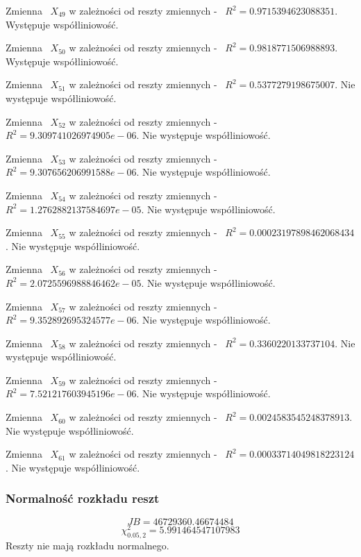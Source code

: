 \documentclass{article}
\begin{document}
Zmienna ~$X_{49}$ w zależności od reszty zmiennych - ~$R^2 = 0.9715394623088351$.
Występuje współliniowość.

Zmienna ~$X_{50}$ w zależności od reszty zmiennych - ~$R^2 = 0.9818771506988893$.
Występuje współliniowość.

Zmienna ~$X_{51}$ w zależności od reszty zmiennych - ~$R^2 = 0.5377279198675007$.
Nie występuje współliniowość.

Zmienna ~$X_{52}$ w zależności od reszty zmiennych - ~$R^2 = 9.309741026974905e-06$.
Nie występuje współliniowość.

Zmienna ~$X_{53}$ w zależności od reszty zmiennych - ~$R^2 = 9.307656206991588e-06$.
Nie występuje współliniowość.

Zmienna ~$X_{54}$ w zależności od reszty zmiennych - ~$R^2 = 1.2762882137584697e-05$.
Nie występuje współliniowość.

Zmienna ~$X_{55}$ w zależności od reszty zmiennych - ~$R^2 = 0.00023197898462068434$.
Nie występuje współliniowość.

Zmienna ~$X_{56}$ w zależności od reszty zmiennych - ~$R^2 = 2.0725596988846462e-05$.
Nie występuje współliniowość.

Zmienna ~$X_{57}$ w zależności od reszty zmiennych - ~$R^2 = 9.352892695324577e-06$.
Nie występuje współliniowość.

Zmienna ~$X_{58}$ w zależności od reszty zmiennych - ~$R^2 = 0.3360220133737104$.
Nie występuje współliniowość.

Zmienna ~$X_{59}$ w zależności od reszty zmiennych - ~$R^2 = 7.521217603945196e-06$.
Nie występuje współliniowość.

Zmienna ~$X_{60}$ w zależności od reszty zmiennych - ~$R^2 = 0.0024583545248378913$.
Nie występuje współliniowość.

Zmienna ~$X_{61}$ w zależności od reszty zmiennych - ~$R^2 = 0.00033714049818223124$.
Nie występuje współliniowość.

\subsubsection{Normalność rozkładu reszt}
\[JB = 46729360.46674484\]
\[\chi^2_{0.05, 2} = 5.991464547107983\]
Reszty nie mają rozkładu normalnego.
\end{document}
